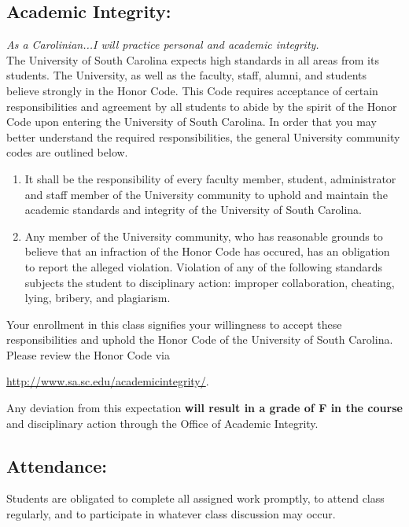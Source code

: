 \documentclass[10pt]{amsart}
\begin{document}
\subsection*{Academic Integrity:} 
\textit{As a Carolinian...I will practice personal and academic integrity.}\\

\noindent 
The University of South Carolina expects high standards in all areas from its students.
The University, as well as the faculty, staff, alumni, and students believe strongly in the Honor Code.
This Code requires acceptance of certain responsibilities and agreement by all students to abide by the spirit of the Honor Code upon entering the University of South Carolina.
In order that you may better understand the required responsibilities, the general University community codes are outlined below.

\begin{enumerate}
\item
  It shall be the responsibility of every faculty member, student, administrator and staff member of the University community to uphold and maintain the academic standards and integrity of the University of South Carolina.
\item
  Any member of the University community, who has reasonable grounds to believe that an infraction of the Honor Code has occured, has an obligation to report the alleged violation.
  Violation of any of the following standards subjects the student to disciplinary action: improper collaboration, cheating, lying, bribery, and plagiarism.
\end{enumerate}

\noindent
Your enrollment in this class signifies your willingness to accept these responsibilities and uphold the Honor Code of the University of South Carolina.
Please review the Honor Code via
\begin{center}
  \url{http://www.sa.sc.edu/academicintegrity/}.
\end{center}

\noindent
Any deviation from this expectation \textbf{will result in a grade of F in the course} and disciplinary action through the Office of Academic Integrity.
\subsection*{Attendance:} 
Students are obligated to complete all assigned work promptly, to attend class regularly, and to participate in whatever class discussion may occur.\\
\end{document}
